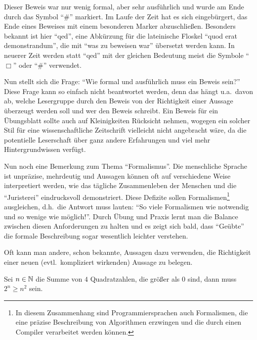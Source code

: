\bigskip

Dieser Beweis war nur wenig formal, aber sehr ausführlich und wurde
am Ende durch das Symbol "`$\#$"' markiert. Im Laufe der Zeit
hat es sich eingebürgert, das Ende eines Beweises mit einem besonderen
Marker abzuschließen.  Besonders bekannt ist hier
"`$\mathrm{qed}$"', eine Abkürzung für die
lateinische Floskel "`quod erat demonstrandum"', die mit "`was zu
beweisen war"' übersetzt werden kann. In neuerer Zeit werden statt
"`$\mathrm{qed}$"' mit der gleichen Bedeutung meist die Symbole
"`$\Box$"' oder "`$\#$"' \index{$\#$}\index{$\Box$}
verwendet.

Nun stellt sich die Frage: "`Wie formal und ausführlich muss ein
Beweis sein?"' Diese Frage kann so einfach nicht beantwortet werden,
denn das hängt u.a.~davon ab, welche Lesergruppe durch den Beweis von
der Richtigkeit einer Aussage überzeugt werden soll und wer den Beweis
schreibt. Ein Beweis für ein Übungsblatt sollte auch auf Kleinigkeiten
Rücksicht nehmen, wogegen ein solcher Stil für eine wissenschaftliche
Zeitschrift vielleicht nicht angebracht wäre, da die potentielle
Leserschaft über ganz andere Erfahrungen und viel mehr
Hintergrundwissen verfügt. 

Nun noch eine Bemerkung zum Thema
"`Formalismus"'. Die menschliche Sprache ist unpräzise, mehrdeutig und
Aussagen können oft auf verschiedene Weise interpretiert werden, wie das
tägliche Zusammenleben der Menschen und die "`Juristerei"' eindrucksvoll demonstriert. Diese Defizite sollen Formalismen\footnote{In diesem Zusammenhang sind
Programmiersprachen auch Formalismen, die eine präzise Beschreibung
von Algorithmen erzwingen und die durch einen Compiler verarbeitet
werden können.} ausgleichen, d.h.~die Antwort muss lauten: "`So viele
Formalismen wie notwendig und so wenige wie möglich!"'. Durch Übung
und Praxis lernt man die Balance zwischen diesen Anforderungen zu
halten und es zeigt sich bald, dass "`Geübte"' die formale
Beschreibung sogar wesentlich leichter verstehen.

\bigskip
\goodbreak

Oft kann man andere, schon bekannte, Aussagen dazu verwenden, die
Richtigkeit einer neuen (evtl.~kompliziert wirkenden) Aussage zu belegen.

\goodbreak
\begin{theorem}
\label{ExpoGTSquare2}
Sei $n \in \mathbb N$ die Summe von $4$ Quadratzahlen, die größer als $0$
sind, dann muss $2^n \ge n^2$ sein.
\end{theorem}

